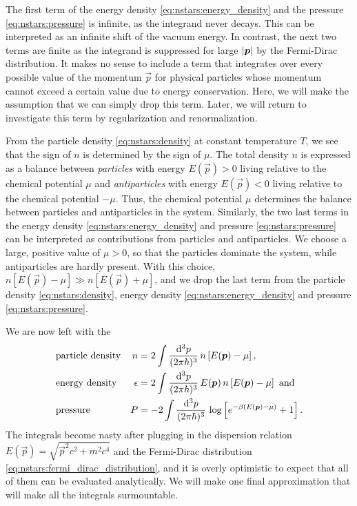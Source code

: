 The first term of the energy density \eqref{eq:nstars:energy_density} and the pressure \eqref{eq:nstars:pressure} is infinite, as the integrand never decays.
This can be interpreted as an infinite shift of the vacuum energy.
In contrast, the next two terms are finite as the integrand is suppressed for large $\left\lvert {\bm{p}} \right\rvert$ by the Fermi-Dirac distribution.
It makes no sense to include a term that integrates over every possible value of the momentum $\vec{p}$ for physical particles whose momentum cannot exceed a certain value due to energy conservation.
Here, we will make the assumption that we can simply drop this term.
Later, we will return to investigate this term by regularization and renormalization. 

From the particle density \eqref{eq:nstars:density} at constant temperature $T$, we see that the sign of $n$ is determined by the sign of $\mu$.
The total density $n$ is expressed as a balance between \emph{particles} with energy $E(\vec{p}) > 0$ living relative to the chemical potential $\mu$ and \emph{antiparticles} with energy $E(\vec{p}) < 0$ living relative to the chemical potential $-\mu$.
Thus, the chemical potential $\mu$ determines the balance between particles and antiparticles in the system.
Similarly, the two last terms in the energy density \eqref{eq:nstars:energy_density} and pressure \eqref{eq:nstars:pressure} can be interpreted as contributions from particles and antiparticles.
We choose a large, positive value of $\mu > 0$, so that the particles dominate the system, while antiparticles are hardly present.
With this choice, $n \left[ E(\vec{p}) - \mu \right] \gg n \left[ E(\vec{p}) + \mu \right]$, and we drop the last term from the particle density \eqref{eq:nstars:density}, energy density \eqref{eq:nstars:energy_density} and pressure \eqref{eq:nstars:pressure}.

We are now left with the 
\begin{equation}
\begin{aligned}
	& \text{particle density} & n        &=  2 \int \frac{\mathop{}\!\mathrm{d}^3 p}{(2 \pi \hbar)^3} \, n \left[ E({\bm{p}})-\mu \right] , \\
	& \text{energy density}   & \epsilon &=  2 \int \frac{\mathop{}\!\mathrm{d}^3 p}{(2 \pi \hbar)^3} \, E({\bm{p}}) \, n \left[ E({\bm{p}})-\mu \right] \text{ and} \\
	& \text{pressure}         & P        &= -2 \int \frac{\mathop{}\!\mathrm{d}^3 p}{(2 \pi \hbar)^3} \, \log \left[ e^{-\beta(E({\bm{p}})-\mu)} + 1 \right] . \\
\end{aligned}
\end{equation}
The integrals become nasty after plugging in the dispersion relation $E(\vec{p}) = \sqrt{\vec{p}^2 c^2 + m^2 c^4}$  and the Fermi-Dirac distribution \eqref{eq:nstars:fermi_dirac_distribution}, and it is overly optimistic to expect that all of them can be evaluated analytically.
We will make one final approximation that will make all the integrals surmountable.

